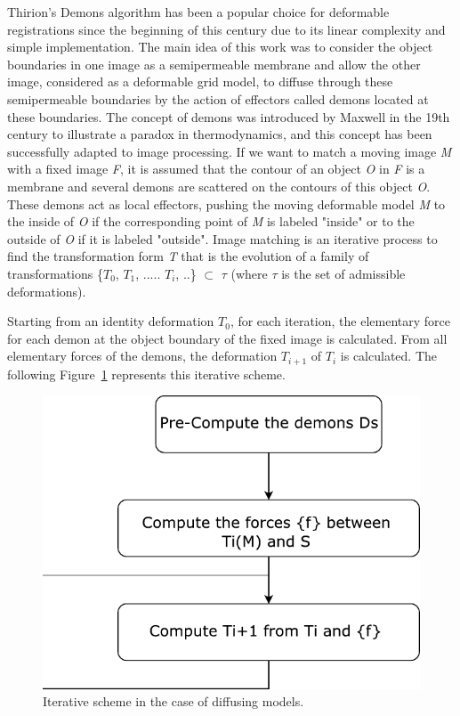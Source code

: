 \documentclass{report}
\begin{document}
	Thirion's Demons algorithm \cite{THIRION1998243} has been a popular choice for deformable registrations since the beginning of this century due to its linear complexity and simple implementation. The main idea of this work was to consider the object boundaries in one image as a semipermeable membrane and allow the other image, considered as a deformable grid model, to diffuse through these semipermeable boundaries by the action of effectors called demons located at these boundaries. The concept of demons was introduced by Maxwell in the 19th century to illustrate a paradox in thermodynamics, and this concept has been successfully adapted to image processing. If we want to match a moving image \emph{M} with a fixed image \emph{F}, it is assumed that the contour of an object \emph{O} in \emph{F} is a membrane and several demons are scattered on the contours of this object \emph{O}. These demons act as local effectors, pushing the moving deformable model \emph{M} to the inside of \emph{O} if the corresponding point of \emph{M} is labeled "inside" or to the outside of \emph{O} if it is labeled "outside".
	Image matching is an iterative process to find the transformation form \emph{T} that is the  evolution of a family of transformations \{$T_0$, $T_1$, ..... $T_i$, ..\} $\subset$ $\tau$ (where $\tau$ is the set of admissible deformations).
	
	Starting from an identity deformation {$T_0$}, for each iteration, the elementary force for each demon at the object boundary of the fixed image is calculated. From all elementary forces of the demons, the deformation $T_{i+1}$ of $T_i$ is calculated. The following Figure~\ref{fig:demons} represents this iterative scheme.
	
	\begin{figure}[h]
		\centering
		\includegraphics[width=0.7\columnwidth]{resources/chapter2/Demons.pdf}
		\caption{Iterative scheme in the case of diffusing models. \cite{THIRION1998243}}
		\label{fig:demons}
	\end{figure}
	
\end{document}
